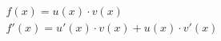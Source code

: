 \documentclass[preview]{standalone}
\begin{document}
\begin{align*}
f(x) = u(x) \cdot v(x)\\ f'(x) = u'(x) \cdot v(x) + u(x) \cdot v'(x)
\end{align*}
\end{document}
